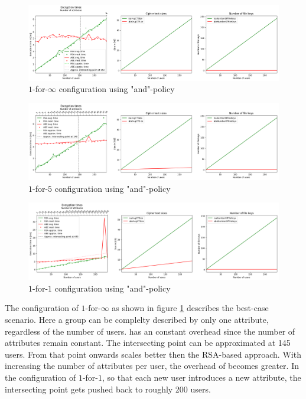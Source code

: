 \begin{figure}[!t]
\centering
    \includegraphics[width=\linewidth]{img/eval-and-policy/encrypt_incrementing_10.png}
    \caption{$1$-for-$\infty$ configuration using "and"-policy}
    \label{fig:1-for-infty-and}
\end{figure}
\begin{figure}[!t]
\centering
    \includegraphics[width=\linewidth]{img/eval-and-policy/encrypt_incrementing_10_attribute_increment_1per5User.png}
    \caption{$1$-for-$5$ configuration using "and"-policy}
    \label{fig:1-for-5-and}
\end{figure}
\begin{figure}[!t]
\centering
    \includegraphics[width=\linewidth]{img/eval-and-policy/encrypt_incrementing_10_attribute_increment_1per1User.png}
    \caption{$1$-for-$1$ configuration using "and"-policy}
    \label{fig:1-for-1-and}
\end{figure}

The configuration of $1$-for-$\infty$ as shown in figure \ref{fig:1-for-infty-and} describes the best-case scenario. Here a group can be complelty described by only one attribute, regardless of the number of users. \name has an constant overhead since the number of attributes remain constant. The intersecting point can be approximated at 145 users. From that point onwards \name scales better then the RSA-based approach. With increasing the number of attributes per user, the overhead of \name becomes greater. In the configuration of $1$-for-$1$, so that each new user introduces a new attribute, the intersecting point gets pushed back to roughly 200 users. 

